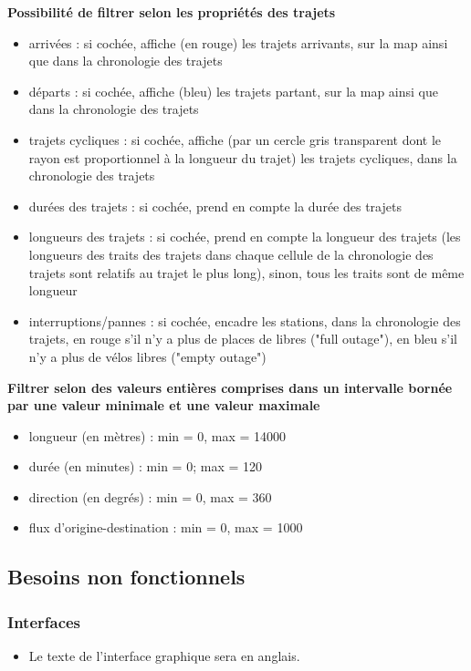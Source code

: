 \documentclass[12pt]{article}
\begin{document}
				\textbf{Possibilité de filtrer selon les propriétés des trajets}\\
					\begin{itemize}
						\item arrivées : si cochée, affiche (en rouge) les trajets arrivants, sur la map ainsi que dans la chronologie des trajets
						\item départs : si cochée, affiche (bleu) les trajets partant, sur la map ainsi que dans la chronologie des trajets
						\item trajets cycliques : si cochée, affiche (par un cercle gris transparent dont le rayon est proportionnel à la longueur du trajet) les trajets cycliques, dans la chronologie des trajets
						\item durées des trajets : si cochée, prend en compte la durée des trajets
						\item longueurs des trajets : si cochée, prend en compte la longueur des trajets (les longueurs des traits des trajets dans chaque cellule de la chronologie des trajets sont relatifs au trajet le plus long), sinon, tous les  traits sont de même longueur
						\item interruptions/pannes : si cochée, encadre les stations, dans la chronologie des trajets, en rouge s'il n'y a plus de places de libres ("full outage"), en bleu s'il n'y a plus de vélos libres ("empty outage")
					\end{itemize}

				\textbf{Filtrer selon des valeurs entières comprises dans un intervalle bornée par une valeur minimale et une valeur maximale}\\
					\begin{itemize}
						\item longueur (en mètres) : min = 0, max = 14000
						\item durée (en minutes) : min = 0; max = 120 
						\item direction (en degrés) : min = 0, max = 360
						\item flux d'origine-destination : min = 0, max = 1000
					\end{itemize}

		\subsection{Besoins non fonctionnels}
			\subsubsection{Interfaces}
				\begin{itemize}
					\item Le texte de l'interface graphique sera en anglais.
				\end{itemize}
\end{document}
